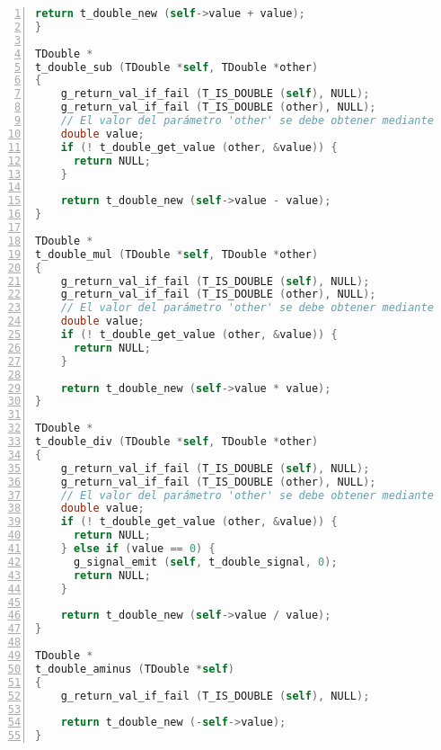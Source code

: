 \begin{lstlisting}[language=C, numbers=left]
    return t_double_new (self->value + value);
}

TDouble *
t_double_sub (TDouble *self, TDouble *other)
{
    g_return_val_if_fail (T_IS_DOUBLE (self), NULL);
    g_return_val_if_fail (T_IS_DOUBLE (other), NULL);
    // El valor del parámetro 'other' se debe obtener mediante el método 'getter'
    double value;
    if (! t_double_get_value (other, &value)) {
      return NULL;
    }

    return t_double_new (self->value - value);
}

TDouble *
t_double_mul (TDouble *self, TDouble *other)
{
    g_return_val_if_fail (T_IS_DOUBLE (self), NULL);
    g_return_val_if_fail (T_IS_DOUBLE (other), NULL);
    // El valor del parámetro 'other' se debe obtener mediante el método 'getter'
    double value;
    if (! t_double_get_value (other, &value)) {
      return NULL;
    }

    return t_double_new (self->value * value);
}

TDouble *
t_double_div (TDouble *self, TDouble *other)
{
    g_return_val_if_fail (T_IS_DOUBLE (self), NULL);
    g_return_val_if_fail (T_IS_DOUBLE (other), NULL);
    // El valor del parámetro 'other' se debe obtener mediante el método 'getter'
    double value;
    if (! t_double_get_value (other, &value)) {
      return NULL;
    } else if (value == 0) {
      g_signal_emit (self, t_double_signal, 0);
      return NULL;
    }
    
    return t_double_new (self->value / value);
}

TDouble *
t_double_aminus (TDouble *self)
{
    g_return_val_if_fail (T_IS_DOUBLE (self), NULL);

    return t_double_new (-self->value);
}
\end{lstlisting}

